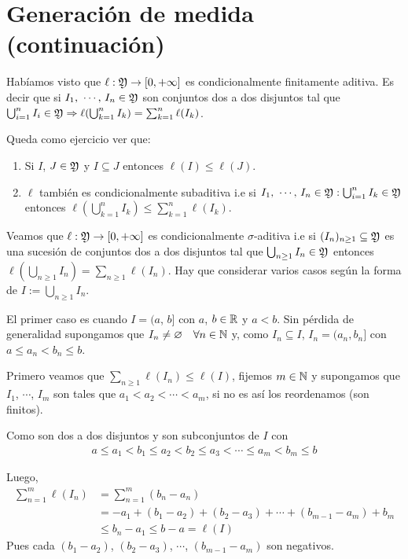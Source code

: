 \section{Generación de medida (continuación)}

Habíamos visto que $\ell : \mathfrak{Y} \to [0, +\infty]$ es condicionalmente finitamente aditiva.
Es decir que si $I_1 \text{, } \cdots \text{, } I_n \in \mathfrak{Y}$ son conjuntos dos a dos disjuntos tal que
$\bigcup_{i = 1}^n I_i \in \mathfrak{Y} \Rightarrow \ell(\bigcup_{k = 1}^n I_k) = \sum_{k = 1}^n \ell(I_k)$.

Queda como ejercicio ver que: \begin{enumerate}
    \item Si $I$, $J \in \mathfrak{Y}$ y $I \subseteq J$ entonces $\ell(I) \leq \ell(J)$.
    \item $\ell$ también es condicionalmente subaditiva i.e si $I_1 \text{, } \cdots \text{, } I_n \in \mathfrak{Y} : \bigcup_{i = 1}^n I_k \in \mathfrak{Y}$ entonces
          $\ell(\bigcup_{k = 1}^n I_k) \leq \sum_{k = 1}^n \ell(I_k)$.
\end{enumerate}


Veamos que $\ell: \mathfrak{Y} \to [0, +\infty]$ es condicionalmente $\sigma$-aditiva i.e si $(I_n)_{n \geq 1} \subseteq \mathfrak{Y}$ es una sucesión
de conjuntos dos a dos disjuntos tal que $\bigcup_{n \geq 1} I_n \in \mathfrak{Y}$ entonces $\ell(\bigcup_{n \geq 1} I_n) = \sum_{n \geq 1} \ell(I_n)$.
Hay que considerar varios casos según la forma de $I := \bigcup_{n \geq 1} I_n$.

El primer caso es cuando $I = (a$, $b]$ con $a$, $b \in \mathbb{R}$ y $a < b$.
Sin pérdida de generalidad supongamos que $I_n \neq \varnothing \quad \forall n \in \mathbb{N}$ y, como $I_n \subseteq I$,
$I_n = (a_n, b_n]$ con $a \leq a_n < b_n \leq b$.

Primero veamos que $\sum_{n \geq 1} \ell(I_n) \leq \ell(I)$, fijemos $m \in \mathbb{N}$ y supongamos que $I_1$, $\cdots$, $I_m$ son tales que
$a_1 < a_2 < \cdots < a_m$, si no es así los reordenamos (son finitos).

Como son dos a dos disjuntos y son subconjuntos de $I$ con \begin{align*}
    a \leq a_1 < b_1 \leq a_2 < b_2 \leq a_3 < \cdots \leq a_m < b_m \leq b
\end{align*}

Luego, \begin{align*}
    \sum_{n = 1}^m \ell(I_n) & = \sum_{n = 1}^m (b_n - a_n)                                          \\
                             & = -a_1 + (b_1 - a_2) + (b_2 - a_3) + \cdots + (b_{m - 1} - a_m) + b_m \\
                             & \leq b_n - a_1 \leq b - a = \ell(I)
\end{align*} Pues cada $(b_1 - a_2)$, $(b_2 - a_3)$, $\cdots$, $(b_{m - 1} - a_m)$ son negativos.

